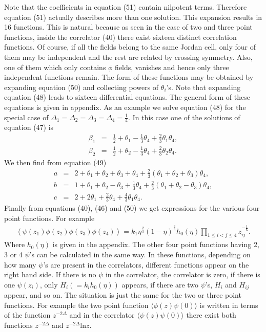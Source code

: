 \documentclass[a4paper,11pt]{article}
\begin{document}
Note that the coefficients in equation (51) contain nilpotent
terms. Therefore equation (51) actually describes more than one
solution. This expansion results in 16 functions. This is natural
because as seen in the case of two and three point functions,
inside the correlator (40) there exist sixteen distinct
correlation functions. Of course, if all the fields belong to the
same Jordan cell, only four of them may be independent and the
rest are related by crossing symmetry. Also, one of them which
only contains $\phi$ fields, vanishes and hence only three
independent functions remain. The form of these functions may be
obtained by expanding equation (50) and collecting powers of
$\theta_{i}$'s. Note that expanding equation (48) leads to
sixteen differential equations. The general form of these
equations is given in appendix. As an example we solve equation
(48) for the special case of $
\Delta_{1}=\Delta_{2}=\Delta_{3}=\Delta_{4}=\frac{1}{4}$. In this
case one of the solutions of equation (47) is
\begin{eqnarray}\label{eq:a53}
\beta_{1}&=&\frac{1}{2}+\theta_{1}-\frac{1}
{3}\theta_{4}+\frac{2}{3}\theta_{1}\theta_{4} ,\nonumber\\
\beta_{2}&=&\frac{1}{2}+\theta_{2}-\frac{1}{3}
\theta_{4}+\frac{2}{3}\theta_{2}\theta_{4} .
\end{eqnarray}
We then find from equation (49)
\begin{eqnarray}\label{eq:a54}
a&=&2+\theta_{1}+\theta_{2}+\theta_{3}+\theta_{4}
+\frac{2}{3}(\theta_{1}+\theta_{2}+\theta_{3}) \theta_{4} ,
\nonumber\\ b&=&1+\theta_{1}+\theta_{2}-\theta_{3}+
\frac{1}{3}\theta_{4}+\frac{2}{3}(\theta_{1}+\theta_{2}-\theta_{3})
\theta_{4} ,\nonumber\\
c&=&2+2\theta_{1}+\frac{2}{3}\theta_{4}+\frac{4}{3}\theta_{1}
\theta_{4} .
\end{eqnarray}
Finally from equations (40), (46) and (50) we get expressions for
the various four point functions. For example
\begin{eqnarray}\label{eq:a55}
\left<\psi(z_{1})\phi(z_{2})\phi(z_{3})\phi(z_{4})
\right>=k_{1}\eta^{\frac{2}{3}}(1-\eta)^{\frac{2}{3}}h_{0}(\eta)\prod_{1\leq
i<j\leq4}z_{ij}^{-\frac{1}{6}} .
\end{eqnarray}
Where $h_{0}(\eta)$ is given in the appendix. The other four point
functions having 2, 3 or 4 $\psi$'s can be calculated in the same
way. In these functions, depending on how many $\psi$'s are
present in the correlators, different functions appear on the
right hand side. If there is no $\psi$ in the correlator, the
correlator is zero, if there is one $\psi(z_{i})$, only
$H_{i}(=k_{i}h_{0}(\eta))$ appears, if there are two $\psi$'s,
$H_{i}$ and $H_{ij}$ appear, and so on. The situation is just the
same for the two or three point functions. For example the two
point function $\langle \phi (z) \psi(0) \rangle$ is written in
terms of the function $z^{-2\Delta}$ and in the correlator
$\langle \psi (z) \psi(0) \rangle$ there exist both functions
$z^{-2\Delta}$ and $z^{-2\Delta}$ln$z$.
\end{document}
